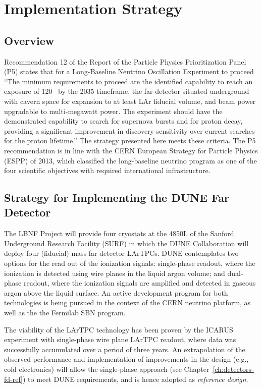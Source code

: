 
\chapter{Implementation Strategy}
\label{ch:detectors-strategy}

\section{Overview}

Recommendation 12 of the Report of the Particle Physics Prioritization
Panel (P5) states that for a Long-Baseline Neutrino Oscillation
Experiment to proceed ``The minimum requirements to proceed are the
identified capability to reach an exposure of
120~\ktMWyr{} by the 2035 timeframe, the far detector
situated underground with cavern space for expansion to at least 
LAr fiducial volume, and  beam power upgradable to
multi-megawatt power. The experiment should have the demonstrated
capability to search for supernova bursts and for proton decay,
providing a significant improvement in discovery sensitivity over
current searches for the proton lifetime.''  The strategy presented
here meets these criteria.  The P5 recommendation is in line with the CERN
European Strategy for Particle Physics (ESPP) of 2013, which
classified the long-baseline neutrino program as one of the four
scientific objectives with required international infrastructure.

\section{Strategy for Implementing the DUNE Far Detector}
\label{sec:detectors-strategy-FD}
The LBNF Project will provide four cryostats at the 4850L of the Sanford
Underground Research Facility (SURF) in which the DUNE Collaboration
will deploy four  (fiducial) mass far detector LArTPCs. 
DUNE contemplates two options for the
read out of the ionization signals: single-phase readout, where the
ionization is detected using wire planes in the liquid argon volume;
and dual-phase readout, where the ionization signals are amplified and
detected in gaseous argon above the liquid surface.  An active
development program for both technologies is being pursued in the
context of the CERN neutrino platform, as well as the
the Fermilab SBN program.

The viability of the LArTPC technology has been proven by the ICARUS
experiment with single-phase wire plane LArTPC readout, where data was
successfully accumulated over a period of three years.  An
extrapolation of the observed performance and implementation of
improvements in the design (e.g., cold electronics) will allow the
single-phase approach (see
Chapter~\ref{ch:detectors-fd-ref}) to meet DUNE requirements, and
is hence adopted as \textit{reference design}. 

